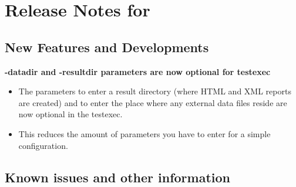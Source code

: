 \makeatletter
\section{Release Notes for \@bxversion}
\makeatother

\subsection{New Features and Developments}
\textbf{-datadir and -resultdir parameters are now optional for testexec}
\begin{itemize}
\item The parameters to enter a result directory (where HTML and XML reports are created) and to enter the place where any external data files reside are now optional in the testexec.
\item This reduces the amount of parameters you have to enter for a simple configuration.
\end{itemize}

\subsection{Known issues and other information}
